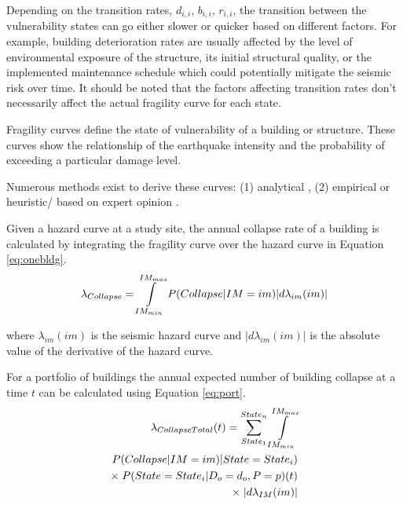 Depending on the transition rates, $d_{i,i}$, $b_{i,i}$, $r_{i,i}$, the transition between the vulnerability states can go either slower or quicker based on different factors. For example, building deterioration rates are usually affected by the level of environmental exposure of the structure, its initial structural quality, or the implemented maintenance schedule which could potentially mitigate the seismic risk over time.
It should be noted that the factors affecting transition rates don't necessarily affect the actual fragility curve for each state.

Fragility curves define the state of vulnerability of a building or structure. These curves show the relationship of the earthquake intensity and the probability of exceeding a particular damage level.

Numerous methods exist to derive these curves: (1) analytical \citep{singhal1996method, lallemant2015statistical}, (2) empirical \citep{sanchez2005science,noh2015development} or heuristic/ based on expert opinion \citep{jaiswal2012use}.

Given a hazard curve at a study site, the annual collapse rate of a building is calculated by integrating the fragility curve over the hazard curve in Equation \ref{eq:onebldg}.
\begin{equation}
\begin{split}
    \lambda_{Collapse} = \int\limits_{IM_{min}}^{IM_{max}} P(Collapse |IM=im) | d\lambda_{im} (im) |
\end{split}
\label{eq:onebldg}
\end{equation}

where $\lambda_{im} (im)$ is the seismic hazard curve and $| d\lambda_{im} (im) |$ is the absolute value of the derivative of the hazard curve.

For a portfolio of buildings  the annual expected number of building collapse at a time $t$ can be calculated using Equation \ref{eq:port}.
\begin{equation}
\begin{split}
    \lambda_{Collapse Total}(t) = \sum_{State_{1}}^{State_{n}}\int\limits_{IM_{min}}^{IM_{max}}\\
     P(Collapse |IM=im)| State=State_{i})  \\
     \times \; P(State=State_{i} |D_{o} =d_{o}, P=p)(t) \\
    \times \; | d\lambda_{IM} (im) |
\end{split}
\label{eq:port}
\end{equation}

